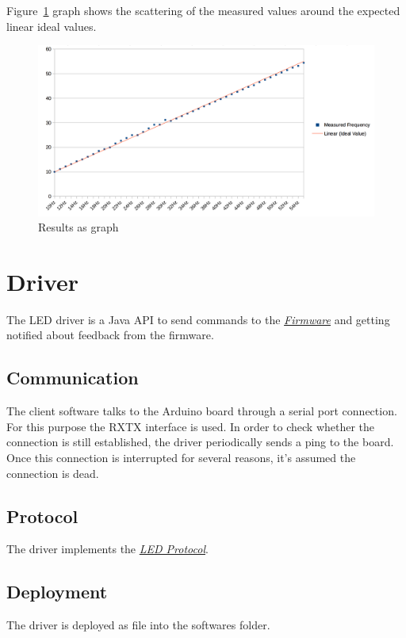 Figure~\ref{fig:firmware-verification} graph shows the scattering of the measured values around the expected linear ideal values.

\begin{figure}[H]
	\centering
	\includegraphics[width=\textwidth]{images/firmware-verification.png}
	\caption{Results as graph}
	\label{fig:firmware-verification}
\end{figure}


\chapter{Driver}
\label{source/driver:driver}\label{source/driver::doc}
The LED driver is a Java API to send commands to the {\hyperref[source/firmware::doc]{\emph{\emph{Firmware}}}} and getting notified about feedback from the firmware.


\section{Communication}
\label{source/driver:communication}
The client software talks to the Arduino board through a serial port connection. For this purpose the RXTX interface is used. In order to check whether the connection is still established, the driver periodically sends a ping to the board. Once this connection is interrupted for several reasons, it's assumed the connection is dead.


\section{Protocol}
\label{source/driver:protocol}
The driver implements the {\hyperref[appendix/led-protocol::doc]{\emph{\emph{LED Protocol}}}}.


\section{Deployment}
\label{source/driver:deployment}
The driver is deployed as  file into the softwares  folder.

